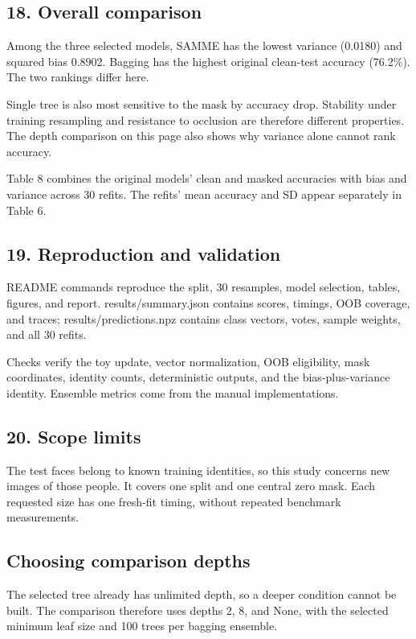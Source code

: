 \documentclass[10pt,twocolumn,letterpaper]{article}
\begin{document}
\subsection*{18. Overall comparison}
Among the three selected models, SAMME has the lowest variance (0.0180) and squared bias 0.8902. Bagging has the highest original clean-test accuracy (76.2\%). The two rankings differ here.

Single tree is also most sensitive to the mask by accuracy drop. Stability under training resampling and resistance to occlusion are therefore different properties. The depth comparison on this page also shows why variance alone cannot rank accuracy.

Table 8 combines the original models' clean and masked accuracies with bias and variance across 30 refits. The refits' mean accuracy and SD appear separately in Table 6.

\subsection*{19. Reproduction and validation}
README commands reproduce the split, 30 resamples, model selection, tables, figures, and report. results/summary.json contains scores, timings, OOB coverage, and traces; results/predictions.npz contains class vectors, votes, sample weights, and all 30 refits.

Checks verify the toy update, vector normalization, OOB eligibility, mask coordinates, identity counts, deterministic outputs, and the bias-plus-variance identity. Ensemble metrics come from the manual implementations.

\subsection*{20. Scope limits}
The test faces belong to known training identities, so this study concerns new images of those people. It covers one split and one central zero mask. Each requested size has one fresh-fit timing, without repeated benchmark measurements.

\newpage
\subsection*{Choosing comparison depths}
The selected tree already has unlimited depth, so a deeper condition cannot be built. The comparison therefore uses depths 2, 8, and None, with the selected minimum leaf size and 100 trees per bagging ensemble.
\end{document}
